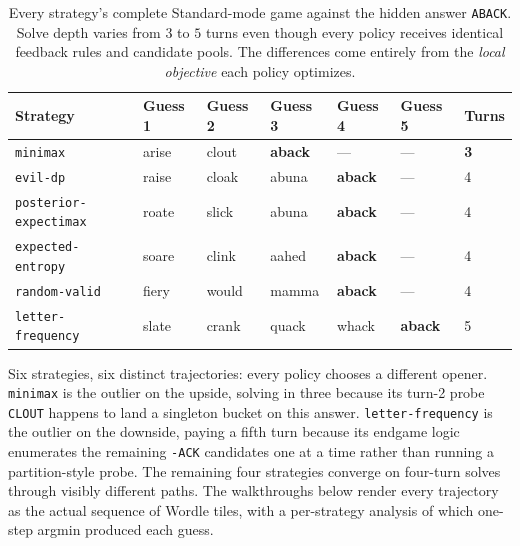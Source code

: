 \documentclass[11pt]{article}
\begin{document}
\begin{table}[h]
\centering\footnotesize
\renewcommand{\arraystretch}{1.05}
\begin{tabular}{@{}l l l l l l l@{}}
\toprule
Strategy & Guess 1 & Guess 2 & Guess 3 & Guess 4 & Guess 5 & Turns\\
\midrule
\texttt{minimax}              & arise & clout & \textbf{aback} & ---   & ---   & \textbf{3}\\
\texttt{evil-dp}              & raise & cloak & abuna & \textbf{aback} & ---   & 4\\
\texttt{posterior-expectimax} & roate & slick & abuna & \textbf{aback} & ---   & 4\\
\texttt{expected-entropy}     & soare & clink & aahed & \textbf{aback} & ---   & 4\\
\texttt{random-valid}         & fiery & would & mamma & \textbf{aback} & ---   & 4\\
\texttt{letter-frequency}     & slate & crank & quack & whack & \textbf{aback} & 5\\
\bottomrule
\end{tabular}
\caption{Every strategy's complete Standard-mode game against the
hidden answer \texttt{ABACK}. Solve depth varies from $3$ to $5$
turns even though every policy receives identical feedback rules and
candidate pools. The differences come entirely from the
\emph{local objective} each policy optimizes.}
\label{tab:aback-trace-std}
\end{table}

Six strategies, six distinct trajectories: every policy chooses a
different opener. \texttt{minimax} is the outlier on the upside,
solving in three because its turn-2 probe \texttt{CLOUT} happens to
land a singleton bucket on this answer. \texttt{letter-frequency}
is the outlier on the downside, paying a fifth turn because its
endgame logic enumerates the remaining \texttt{-ACK} candidates one
at a time rather than running a partition-style probe. The
remaining four strategies converge on four-turn solves through
visibly different paths. The walkthroughs below render every
trajectory as the actual sequence of Wordle tiles, with a
per-strategy analysis of which one-step argmin produced each guess.
\end{document}
